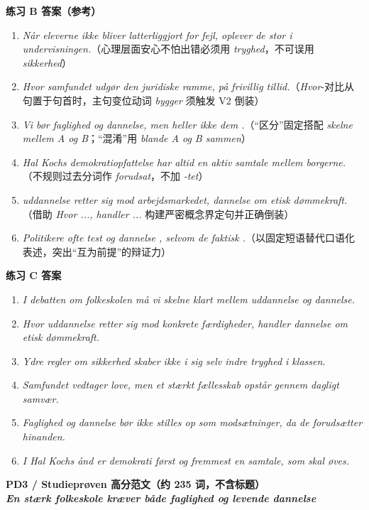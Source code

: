 \begin{answerbox}
\textbf{练习 B 答案（参考）}
\begin{enumerate}
  \item \textit{Når eleverne ikke bliver latterliggjort for fejl, oplever de stor  i undervisningen.}（心理层面安心不怕出错必须用 \textit{tryghed}，不可误用 \textit{sikkerhed}）
  \item \textit{Hvor samfundet udgør den juridiske ramme,  på frivillig tillid.}（\textit{Hvor}-对比从句置于句首时，主句变位动词 \textit{bygger} 须触发 V2 倒装）
  \item \textit{Vi bør  faglighed og dannelse, men heller ikke  dem .}（“区分”固定搭配 \textit{skelne mellem A og B}；“混淆”用 \textit{blande A og B sammen}）
  \item \textit{Hal Kochs demokratiopfattelse har altid  en aktiv samtale mellem borgerne.}（不规则过去分词作 \textit{forudsat}，不加 \textit{-tet}）
  \item \textit{ uddannelse retter sig mod arbejdsmarkedet,  dannelse om etisk dømmekraft.}（借助 \textit{Hvor ..., handler ...} 构建严密概念界定句并正确倒装）
  \item \textit{Politikere  ofte test og dannelse , selvom de faktisk .}（以固定短语替代口语化表述，突出“互为前提”的辩证力）
\end{enumerate}

\textbf{练习 C 答案}
\begin{enumerate}
  \item \textit{I debatten om folkeskolen må vi skelne klart mellem uddannelse og dannelse.}
  \item \textit{Hvor uddannelse retter sig mod konkrete færdigheder, handler dannelse om etisk dømmekraft.}
  \item \textit{Ydre regler om sikkerhed skaber ikke i sig selv indre tryghed i klassen.}
  \item \textit{Samfundet vedtager love, men et stærkt fællesskab opstår gennem dagligt samvær.}
  \item \textit{Faglighed og dannelse bør ikke stilles op som modsætninger, da de forudsætter hinanden.}
  \item \textit{I Hal Kochs ånd er demokrati først og fremmest en samtale, som skal øves.}
\end{enumerate}

\textbf{PD3 / Studieprøven 高分范文（约 235 词，不含标题）}\\
\textit{\textbf{En stærk folkeskole kræver både faglighed og levende dannelse}}


\end{answerbox}
